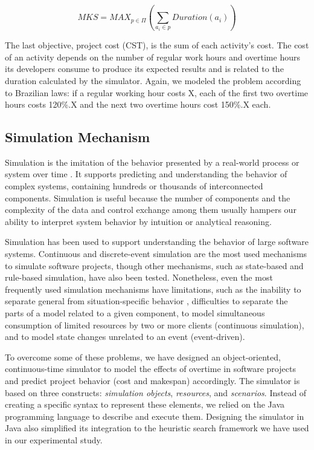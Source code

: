 \documentclass[conference]{IEEEtran}
\begin{document}
\setlength\abovedisplayshortskip{0pt}
\setlength\belowdisplayshortskip{0pt}
\begin{small}
\begin{equation}
MKS = MAX_{p\in\Pi} (\sum_{a_{i} \in p} Duration (a_{i}))
\end{equation}
\end{small}

The last objective, project cost (CST), is the sum of each activity’s cost. The cost of an activity depends on the number of regular work hours and overtime hours its developers consume to produce its expected results and is related to the duration calculated by the simulator. Again, we modeled the problem according to Brazilian laws: if a regular working hour costs X, each of the first two overtime hours costs 120\%.X and the next two overtime hours cost 150\%.X each.


\subsection{Simulation Mechanism}
Simulation is the imitation of the behavior presented by a real-world process or system over time \cite{Banks:2000}. It supports predicting and understanding the behavior of complex systems, containing hundreds or thousands of interconnected components. Simulation is useful because the number of components and the complexity of the data and control exchange among them usually hampers our ability to interpret system behavior by intuition or analytical reasoning.

Simulation has been used to support understanding the behavior of large software systems. Continuous \cite{Forrester:1961} and discrete-event \cite{Ross:1990} simulation are the most used mechanisms to simulate software projects, though other mechanisms, such as state-based \cite{harel:1990} and rule-based \cite{Drappa:1999} simulation, have also been tested. Nonetheless, even the most frequently used simulation mechanisms have limitations, such as the inability to separate general from situation-specific behavior \cite{Barros:2002}, difficulties to separate the parts of a model related to a given component, to model simultaneous consumption of limited resources by two or more clients (continuous simulation), and to model state changes unrelated to an event (event-driven).

To overcome some of these problems, we have designed an object-oriented, continuous-time simulator to model the effects of overtime in software projects and predict project behavior (cost and makespan) accordingly. The simulator is based on three constructs: {\it simulation objects}, {\it resources}, and {\it scenarios}. Instead of creating a specific syntax to represent these elements, we relied on the Java programming language to describe and execute them. Designing the simulator in Java also simplified its integration to the heuristic search framework we have used in our experimental study.
\end{document}
